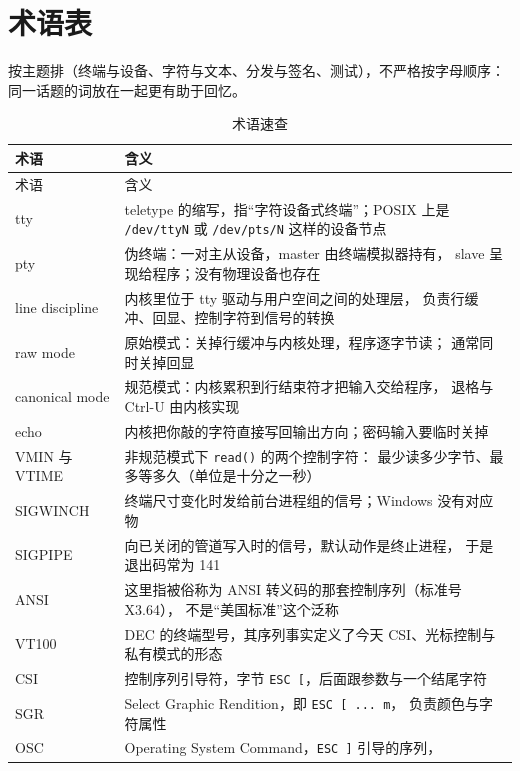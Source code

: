 \documentclass[12pt,a4paper,fontset=fandol]{ctexbook}
\newcommand{\Fn}[1]{\texttt{#1()}}
\newcommand{\Tp}[1]{\texttt{#1}}
\begin{document}
\chapter{术语表}

按主题排（终端与设备、字符与文本、分发与签名、测试），不严格按字母顺序：
同一话题的词放在一起更有助于回忆。

\begin{longtable}{@{}>{\raggedright\arraybackslash}p{}
                 >{\raggedright\arraybackslash}p{}@{}}
\caption{术语速查}
\label{tab:glossary} \\
\toprule
术语 & 含义 \\
\midrule
\endfirsthead
\toprule
术语 & 含义 \\
\midrule
\endhead
tty & teletype 的缩写，指``字符设备式终端''；POSIX 上是
\Tp{/dev/ttyN} 或 \Tp{/dev/pts/N} 这样的设备节点 \\
pty & 伪终端：一对主从设备，master 由终端模拟器持有，
slave 呈现给程序；没有物理设备也存在 \\
line discipline & 内核里位于 tty 驱动与用户空间之间的处理层，
负责行缓冲、回显、控制字符到信号的转换 \\
raw mode & 原始模式：关掉行缓冲与内核处理，程序逐字节读；
通常同时关掉回显 \\
canonical mode & 规范模式：内核累积到行结束符才把输入交给程序，
退格与 Ctrl-U 由内核实现 \\
echo & 内核把你敲的字符直接写回输出方向；密码输入要临时关掉 \\
VMIN 与 VTIME & 非规范模式下 \Fn{read} 的两个控制字符：
最少读多少字节、最多等多久（单位是十分之一秒） \\
SIGWINCH & 终端尺寸变化时发给前台进程组的信号；Windows 没有对应物 \\
SIGPIPE & 向已关闭的管道写入时的信号，默认动作是终止进程，
于是退出码常为 141 \\
ANSI & 这里指被俗称为 ANSI 转义码的那套控制序列（标准号 X3.64），
不是``美国标准''这个泛称 \\
VT100 & DEC 的终端型号，其序列事实定义了今天 CSI、光标控制与
私有模式的形态 \\
CSI & 控制序列引导符，字节 \Tp{ESC [}，后面跟参数与一个结尾字符 \\
SGR & Select Graphic Rendition，即 \Tp{ESC [ ... m}，
负责颜色与字符属性 \\
OSC & Operating System Command，\Tp{ESC ]} 引导的序列，

\end{longtable}
\end{document}
